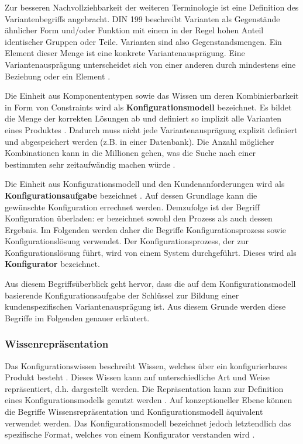 \documentclass[12pt,a4paper,bibliography=totocnumbered,listof=totoc]{scrartcl}
\begin{document}
Zur besseren Nachvollziehbarkeit der weiteren Terminologie ist eine Definition des Variantenbegriffs angebracht. DIN 199 beschreibt Varianten als \glqq Gegenstände ähnlicher Form und/oder Funktion mit einem in der Regel hohen Anteil identischer Gruppen oder Teile\grqq{}. Varianten sind also Gegenstandsmengen. Ein Element dieser Menge ist eine konkrete Variantenausprägung. Eine Variantenausprägung unterscheidet sich von einer anderen durch mindestens eine Beziehung oder ein Element \citep{lutz11}.

Die Einheit aus Komponententypen sowie das Wissen um deren Kombinierbarkeit in Form von Constraints wird als \textbf{Konfigurationsmodell} bezeichnet. Es bildet die Menge der korrekten Lösungen ab und definiert so implizit alle Varianten eines Produktes \citep{soininen98}. Dadurch muss nicht jede Variantenausprägung explizit definiert und abgespeichert werden (z.B. in einer Datenbank). Die Anzahl möglicher Kombinationen kann in die Millionen gehen, was die Suche nach einer bestimmten sehr zeitaufwändig machen würde \citep{falkner11}.

Die Einheit aus Konfigurationsmodell und den Kundenanforderungen wird als \textbf{Konfigurationsaufgabe} bezeichnet \citep{felferning14}. Auf dessen Grundlage kann die gewünschte Konfiguration errechnet werden. Demzufolge ist der Begriff Konfiguration überladen: er bezeichnet sowohl den Prozess als auch dessen Ergebnis. Im Folgenden werden daher die Begriffe Konfigurationsprozess sowie Konfigurationslösung verwendet. Der Konfigurationsprozess, der zur Konfigurationslösung führt, wird von einem System durchgeführt. Dieses wird als \textbf{Konfigurator} bezeichnet.

Aus diesem Begriffsüberblick geht hervor, dass die auf dem Konfigurationsmodell basierende Konfigurationsaufgabe der Schlüssel zur Bildung einer kundenspezifischen Variantenausprägung ist. Aus diesem Grunde werden diese Begriffe im Folgenden  genauer erläutert.

\subsubsection{Wissenrepräsentation}
\label{subsubsection:wissenrepraesentation}
Das Konfigurationswissen beschreibt Wissen, welches über ein konfigurierbares Produkt besteht \citep{soininen98}. Dieses Wissen kann auf unterschiedliche Art und Weise repräsentiert, d.h. dargestellt werden. Die Repräsentation kann zur Definition eines Konfigurationsmodells genutzt werden \citep{felferning14}. Auf konzeptioneller Ebene können die Begriffe Wissensrepräsentation und Konfigurationsmodell äquivalent verwendet werden. Das Konfigurationsmodell bezeichnet jedoch letztendlich das spezifische Format, welches von einem Konfigurator verstanden wird \citep{soininen98}.
\end{document}
